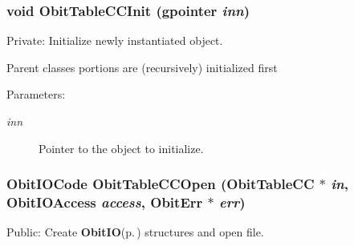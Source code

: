 \subsubsection{\setlength{\rightskip}{0pt plus 5cm}void Obit\-Table\-CCInit (gpointer {\em inn})}\label{ObitTableCC_8c_a8}


Private: Initialize newly instantiated object. 

Parent classes portions are (recursively) initialized first \begin{Desc}
\item[Parameters:]
\begin{description}
\item[{\em inn}]Pointer to the object to initialize. \end{description}
\end{Desc}
\subsubsection{\setlength{\rightskip}{0pt plus 5cm}Obit\-IOCode Obit\-Table\-CCOpen ({\bf Obit\-Table\-CC} $\ast$ {\em in}, Obit\-IOAccess {\em access}, {\bf Obit\-Err} $\ast$ {\em err})}\label{ObitTableCC_8c_a21}


Public: Create {\bf Obit\-IO}{\rm (p.\,\pageref{structObitIO})} structures and open file. 


